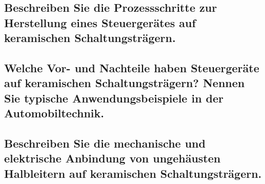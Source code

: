 \subsection{Beschreiben Sie die Prozessschritte zur Herstellung eines Steuergerätes auf keramischen Schaltungsträgern.}

\subsection{Welche Vor- und Nachteile haben Steuergeräte auf keramischen Schaltungsträgern? Nennen Sie typische Anwendungsbeispiele in der Automobiltechnik.}

\subsection{Beschreiben Sie die mechanische und elektrische Anbindung von ungehäusten Halbleitern auf keramischen Schaltungsträgern.}
